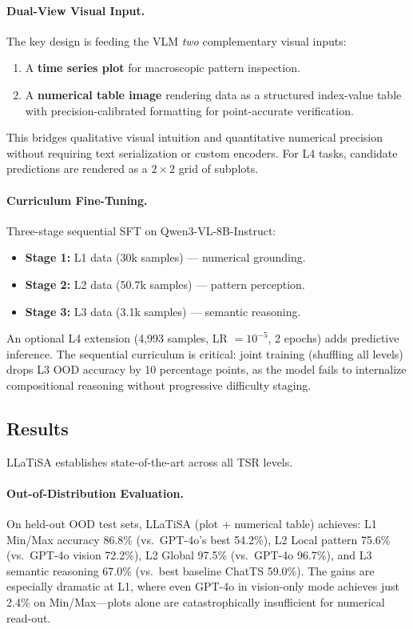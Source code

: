 \documentclass[11pt]{article}
\begin{document}
\paragraph{Dual-View Visual Input.}
The key design is feeding the VLM \emph{two} complementary visual inputs:
\begin{enumerate}
    \item A \textbf{time series plot} for macroscopic pattern inspection.
    \item A \textbf{numerical table image} rendering data as a structured index-value table with precision-calibrated formatting for point-accurate verification.
\end{enumerate}
This bridges qualitative visual intuition and quantitative numerical precision without requiring text serialization or custom encoders. For L4 tasks, candidate predictions are rendered as a $2 \times 2$ grid of subplots.

\paragraph{Curriculum Fine-Tuning.}
Three-stage sequential SFT on Qwen3-VL-8B-Instruct:
\begin{itemize}
    \item \textbf{Stage 1:} L1 data (30k samples) --- numerical grounding.
    \item \textbf{Stage 2:} L2 data (50.7k samples) --- pattern perception.
    \item \textbf{Stage 3:} L3 data (3.1k samples) --- semantic reasoning.
\end{itemize}
An optional L4 extension (4,993 samples, LR $= 10^{-5}$, 2 epochs) adds predictive inference. The sequential curriculum is critical: joint training (shuffling all levels) drops L3 OOD accuracy by 10 percentage points, as the model fails to internalize compositional reasoning without progressive difficulty staging.

\subsection{Results}

LLaTiSA establishes state-of-the-art across all TSR levels.

\paragraph{Out-of-Distribution Evaluation.}
On held-out OOD test sets, LLaTiSA (plot + numerical table) achieves: L1 Min/Max accuracy 86.8\% (vs.\ GPT-4o's best 54.2\%), L2 Local pattern 75.6\% (vs.\ GPT-4o vision 72.2\%), L2 Global 97.5\% (vs.\ GPT-4o 96.7\%), and L3 semantic reasoning 67.0\% (vs.\ best baseline ChatTS 59.0\%). The gains are especially dramatic at L1, where even GPT-4o in vision-only mode achieves just 2.4\% on Min/Max---plots alone are catastrophically insufficient for numerical read-out.
\end{document}
